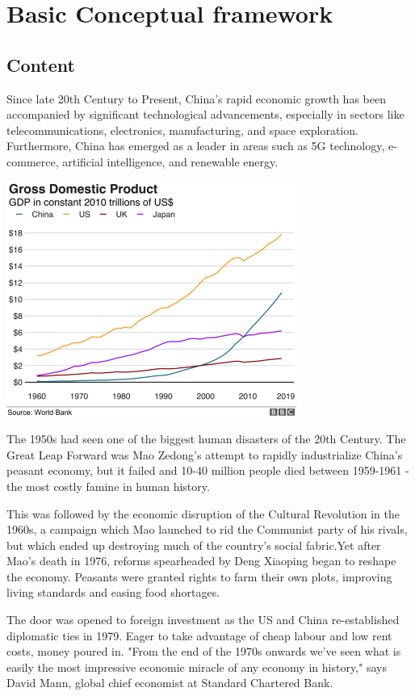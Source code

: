\chapter{Basic Conceptual framework}

\section{Content}

Since late 20th Century to Present, China's rapid economic growth 
has been accompanied by significant technological advancements, 
especially in sectors like telecommunications, electronics, 
manufacturing, and space exploration. Furthermore, China has 
emerged as a leader in areas such as 5G technology, e-commerce, 
artificial intelligence, and renewable energy.

\begin{center}
    \includegraphics{GrossDomesticProduct.png}
\end{center}

The 1950s had seen one of the biggest human disasters of the 20th 
Century. The Great Leap Forward was Mao Zedong's attempt to rapidly 
industrialize China's peasant economy, but it failed and 10-40 
million people died between 1959-1961 - the most costly famine 
in human history.

This was followed by the economic disruption of the Cultural 
Revolution in the 1960s, a campaign which Mao launched to rid the 
Communist party of his rivals, but which ended up destroying much 
of the country's social fabric.Yet after Mao's death in 1976, 
reforms spearheaded by Deng Xiaoping began to reshape the economy. 
Peasants were granted rights to farm their own plots, improving 
living standards and easing food shortages.

The door was opened to foreign investment as the US and China 
re-established diplomatic ties in 1979. Eager to take advantage of 
cheap labour and low rent costs, money poured in. "From the end of 
the 1970s onwards we've seen what is easily the 
most impressive economic miracle of any economy in history," says 
David Mann, global chief economist at Standard Chartered Bank.

